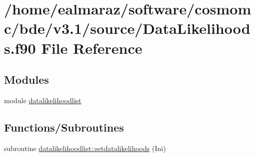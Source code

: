 \hypertarget{DataLikelihoods_8f90}{}\section{/home/ealmaraz/software/cosmomc/bde/v3.1/source/\+Data\+Likelihoods.f90 File Reference}
\label{DataLikelihoods_8f90}
\subsection*{Modules}
\begin{DoxyCompactItemize}
\item 
module \mbox{\hyperlink{namespacedatalikelihoodlist}{datalikelihoodlist}}
\end{DoxyCompactItemize}
\subsection*{Functions/\+Subroutines}
\begin{DoxyCompactItemize}
\item 
subroutine \mbox{\hyperlink{namespacedatalikelihoodlist_ada6561e1822bb1effcfc8bfaa373cc6b}{datalikelihoodlist\+::setdatalikelihoods}} (Ini)
\end{DoxyCompactItemize}
